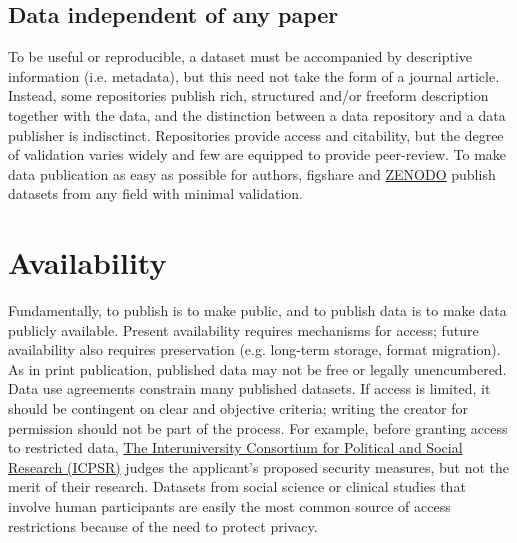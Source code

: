 \documentclass[10pt,twocolumn]{article}
\begin{document}
\subsection*{Data independent of any paper}\label{paper-independent-data}

To be useful or reproducible, a dataset must be accompanied by descriptive information (i.e. metadata)\cite{gray_online_2002}, but this need not take the form of a journal article.
Instead, some repositories publish rich, structured and/or freeform description together with the data, and the distinction between a data repository and a data publisher is indisctinct.
Repositories provide access and citability, but the degree of validation varies widely and few are equipped to provide peer-review.
To make data publication as easy as possible for authors, figshare and \href{https://zenodo.org/}{ZENODO} publish datasets from any field with minimal validation.

\section*{Availability}\label{availability}

Fundamentally, to publish is to make public, and to publish data is to make data publicly available.
Present availability requires mechanisms for access; future availability also requires preservation (e.g. long-term storage, format migration)\cite{waters_preserving_1996, beagrie_digital_2008, gray_online_2002}.
As in print publication, published data may not be free or legally unencumbered.
Data use agreements constrain many published datasets.
If access is limited, it should be contingent on clear and objective criteria; writing the creator for permission should not be part of the process.
For example, before granting access to restricted data, \href{http://www.icpsr.umich.edu/icpsrweb/content/deposit/confidentiality.html}{The Interuniversity Consortium for Political and Social Research (ICPSR)} judges the applicant's proposed security measures, but not the merit of their research.
Datasets from social science or clinical studies that involve human participants are easily the most common source of access restrictions because of the need to protect privacy.
\end{document}
